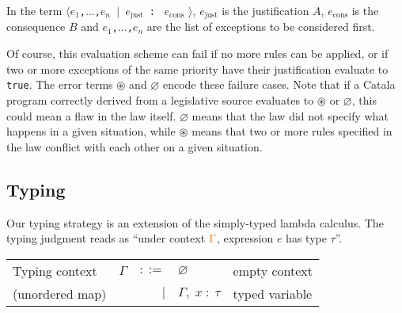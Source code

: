 \documentclass[11pt,a4paper]{article}
\newcommand{\synvar}[1]{\ensuremath{#1}}
\newcommand{\synkeyword}[1]{\textcolor{red!60!black}{\texttt{#1}}}
\newcommand{\synpunct}[1]{\textcolor{black!40!white}{\texttt{#1}}}
\newcommand{\synjust}{~\synpunct{:\raisebox{-0.9pt}{-}}~}
\newcommand{\syntrue}{\synkeyword{true}}
\newcommand{\synlangle}{\synpunct{$\langle$}}
\newcommand{\synrangle}{\synpunct{$\rangle$}}
\newcommand{\synmid}{\synpunct{~$|$~}}
\newcommand{\synemptydefault}{\synvar{\varnothing}}
\newcommand{\synerror}{\synvar{\circledast}}
\newcommand{\synellipsis}{\synpunct{,$\ldots$,}}
\newcommand{\syndef}{$ ::= $}
\newcommand{\synalt}{\;$|$\;}
\newcommand{\typctx}[1]{\textcolor{orange!90!black}{\ensuremath{#1}}}
\newcommand{\typempty}{\typctx{\varnothing}}
\newcommand{\typcomma}{\typctx{,\;}}
\newcommand{\typvdash}{\typctx{\;\vdash\;}}
\newcommand{\typcolon}{\typctx{\;:\;}}
\begin{document}
In the term \synlangle\synvar{e_1}\synellipsis\synvar{e_n}\synmid\synvar{e_{\text{just}}}\synjust
\synvar{e_{\text{cons}}} \synrangle, \synvar{e_{\text{just}}} 
is the justification $A$, \synvar{e_{\text{cons}}} is the consequence $B$ and 
\synvar{e_1}\synellipsis\synvar{e_n} are the list of exceptions to be considered first.
 
Of course, this evaluation scheme can fail if no more 
rules can be applied, or if two or more exceptions of the same priority have their 
justification evaluate to \syntrue{}. The error terms \synerror{} and \synemptydefault{}
encode these failure cases. Note that if a Catala program correctly derived from a legislative 
source evaluates to \synerror{} or \synemptydefault{}, this could mean a flaw in the 
law itself. \synemptydefault{} means that the law did not specify what happens 
in a given situation, while \synerror{} means that two or more rules specified in 
the law conflict with each other on a given situation.

\subsection{Typing}
\label{sec:defaultcalc:typing}

Our typing strategy is an extension of the simply-typed lambda calculus.
The typing judgment \fbox{$\typctx{\Gamma}\typvdash\synvar{e}\typcolon\synvar{\tau}$} reads as
\enquote{under context $\typctx{\Gamma}$, expression $\synvar{e}$ has type $\synvar{\tau}$}.
\begin{center}
  \begin{tabular}{lrrll}
    Typing context&\typctx{\Gamma}&\syndef&\typempty&empty context\\
    (unordered map)&&\synalt&\typctx{\Gamma}\typcomma\synvar{x}\typcolon\synvar{\tau}&typed variable\\
  \end{tabular}
\end{center}
\end{document}
